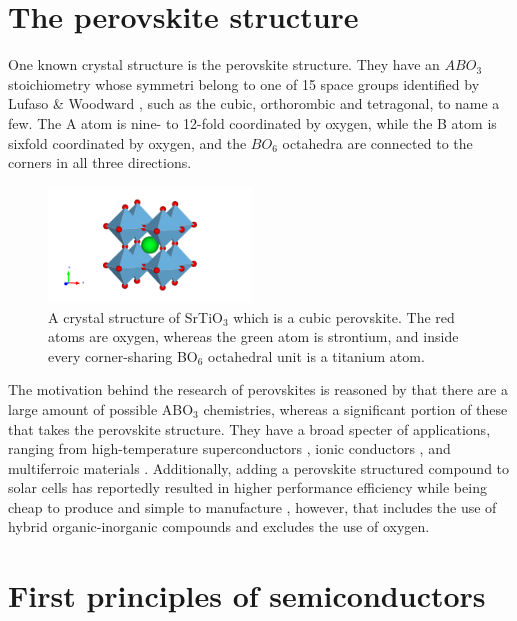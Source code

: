 \section{The perovskite structure}

One known crystal structure is the perovskite structure. They have an $ABO_3$ stoichiometry whose symmetri belong to one of 15 space groups identified by Lufaso \& Woodward \cite{Lufaso2001}, such as the cubic, orthorombic and tetragonal, to name a few. The A atom is nine- to 12-fold coordinated by oxygen, while the B atom is sixfold coordinated by oxygen, and the $BO_6$ octahedra are connected to the corners in all three directions.

\begin{figure}
  \centering
  \includegraphics[width=0.48\textwidth]{theory/figures/SrTiO3_mp-5229_primitive.pdf}
  \caption{A crystal structure of SrTiO$_3$ which is a cubic perovskite. The red atoms are oxygen, whereas the green atom is strontium, and inside every corner-sharing BO$_6$ octahedral unit is a titanium atom.}
  \label{fig:pic}
\end{figure}

The motivation behind the research of perovskites is reasoned by that there are a large amount of possible ABO$_3$ chemistries, whereas a significant portion of these that takes the perovskite structure. They have a broad specter of applications, ranging from high-temperature superconductors \cite{Bednorz1988}, ionic conductors \cite{Boivin1998}, and  multiferroic materials \cite{Cheong2007}. Additionally, adding a perovskite structured compound to solar cells has reportedly resulted in higher performance efficiency while being cheap to produce and simple to manufacture \cite{IbnMohammed2017, Chen2014}, however, that includes the use of hybrid organic-inorganic compounds and excludes the use of oxygen.

\section{First principles of semiconductors}

